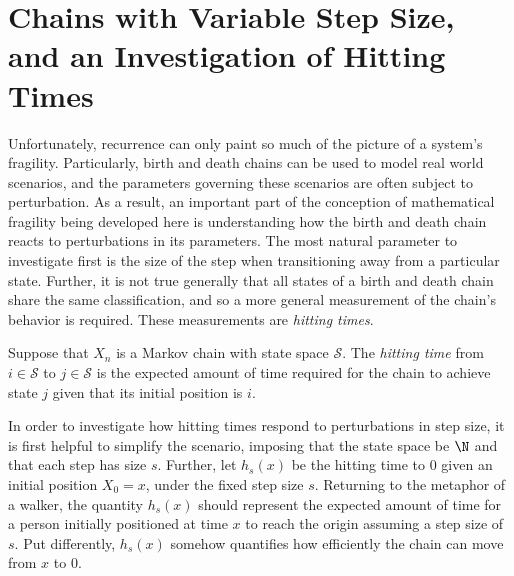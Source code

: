 \section{Chains with Variable Step Size, and an Investigation of Hitting Times}
Unfortunately, recurrence can only paint so much of the picture of a system's fragility. Particularly,
birth and death chains can be used to model real world scenarios, and the parameters governing these
scenarios are often subject to perturbation. As a result, an important part of the conception of
mathematical fragility being developed here is understanding how the birth and death chain reacts to
perturbations in its parameters. The most natural parameter to investigate first is the size of the step
when transitioning away from a particular state. Further, it is not true generally that all states of a
birth and death chain share the same classification, and so a more general measurement of the chain's
behavior is required. These measurements are \emph{hitting times}.
\begin{definition}
    Suppose that $X_n$ is a Markov chain with state space $\mathcal{S}$. The \emph{hitting time} from
    $i \in \mathcal{S}$ to $j \in \mathcal{S}$ is the expected amount of time required for the chain to
    achieve state $j$ given that its initial position is $i$.
\end{definition}

In order to investigate how hitting times respond to perturbations in step size, it is first helpful to
simplify the scenario, imposing that the state space be $\N$ and that each step has size $s$. Further,
let $h_s(x)$ be the hitting time to $0$ given an initial position $X_0 = x$, under the fixed step size
$s$. Returning to the metaphor of a walker, the quantity $h_s(x)$ should represent the expected amount
of time for a person initially positioned at time $x$ to reach the origin assuming a step size of $s$.
Put differently, $h_s(x)$ somehow quantifies how efficiently the chain can move from $x$ to $0$.

